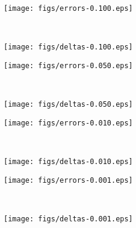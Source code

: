 \documentclass{article}
\begin{document}
\begin{figure}[ht]
    \centering
    \begin{subfigure}[t]{0.48\textwidth}
        \centering
        \texttt{[image: figs/errors-0.100.eps]}
        \caption{}
    \end{subfigure}
    ~
    \centering
    \begin{subfigure}[t]{0.48\textwidth}
        \centering
        \texttt{[image: figs/deltas-0.100.eps]}
        \caption{}
    \end{subfigure}
    \caption{}
\end{figure}

\begin{figure}[ht]
    \centering
    \begin{subfigure}{0.48\textwidth}
        \centering
        \texttt{[image: figs/errors-0.050.eps]}
        \caption{}
    \end{subfigure}
    ~
    \centering
    \begin{subfigure}{0.48\textwidth}
        \centering
        \texttt{[image: figs/deltas-0.050.eps]}
        \caption{}
    \end{subfigure}
    \caption{}
\end{figure}

\begin{figure}[ht]
    \centering
    \begin{subfigure}{0.48\textwidth}
        \centering
        \texttt{[image: figs/errors-0.010.eps]}
        \caption{}
    \end{subfigure}
    ~
    \centering
    \begin{subfigure}{0.48\textwidth}
        \centering
        \texttt{[image: figs/deltas-0.010.eps]}
        \caption{}
    \end{subfigure}
    \caption{}
\end{figure}

\begin{figure}[ht]
    \centering
    \begin{subfigure}{0.48\textwidth}
        \centering
        \texttt{[image: figs/errors-0.001.eps]}
        \caption{}
    \end{subfigure}
    ~
    \centering
    \begin{subfigure}{0.48\textwidth}
        \centering
        \texttt{[image: figs/deltas-0.001.eps]}
        \caption{}
    \end{subfigure}
    \caption{}
\end{figure}
\end{document}

